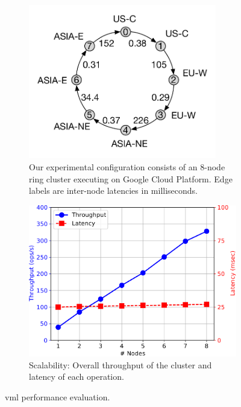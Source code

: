 \documentclass[twocolumn,9pt]{extarticle}
\newcommand{\name}{{\sc vml}\xspace}
\begin{document}
\begin{figure}[t]
  \centering
	\begin{subfigure}{0.45\columnwidth}
		\includegraphics[width=0.9\textwidth]{Figures/cluster.pdf}
		\caption{{\small Our experimental configuration consists of an 8-node ring cluster
			executing on Google Cloud Platform. Edge labels are inter-node latencies in milliseconds.}}
		\label{fig:cluster}
	\end{subfigure}
	\hfill
	\begin{subfigure}{0.5\columnwidth}
		\includegraphics[width=\textwidth]{Figures/scalability.pdf}
		\caption{{\small Scalability: Overall throughput of the cluster and latency of each
		operation.}}
		\label{grf:scalability}
	\end{subfigure}
	\caption{\name performance evaluation.}
  \label{grf:evaluation}
	\vspace{-1em}
\end{figure}
\end{document}
